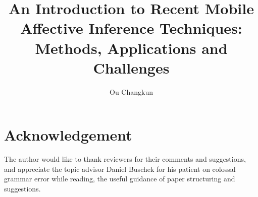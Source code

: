 \documentclass[journal]{vgtc}
\title{An Introduction to Recent Mobile Affective Inference Techniques: \\Methods, Applications and Challenges}
\author{Ou Changkun}
\begin{document}
\maketitle








\section*{Acknowledgement}

The author would like to thank reviewers for their comments and suggestions, and appreciate the topic advisor Daniel Buschek for his patient on colossal grammar error while reading, the useful guidance of paper structuring and suggestions.

\nocite{*}
\printbibliography
\end{document}
